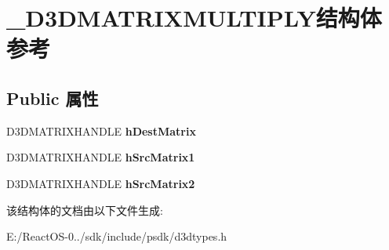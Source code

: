 \hypertarget{struct___d3_d_m_a_t_r_i_x_m_u_l_t_i_p_l_y}{}\section{\+\_\+\+D3\+D\+M\+A\+T\+R\+I\+X\+M\+U\+L\+T\+I\+P\+L\+Y结构体 参考}
\label{struct___d3_d_m_a_t_r_i_x_m_u_l_t_i_p_l_y}
\subsection*{Public 属性}
\begin{DoxyCompactItemize}
\item 
\mbox{\label{struct___d3_d_m_a_t_r_i_x_m_u_l_t_i_p_l_y_a82daf4eafea39a93fe3fef1de85a45c9}} 
D3\+D\+M\+A\+T\+R\+I\+X\+H\+A\+N\+D\+LE {\bfseries h\+Dest\+Matrix}
\item 
\mbox{\label{struct___d3_d_m_a_t_r_i_x_m_u_l_t_i_p_l_y_a9a647104dcb52a39288009c4c8f5952c}} 
D3\+D\+M\+A\+T\+R\+I\+X\+H\+A\+N\+D\+LE {\bfseries h\+Src\+Matrix1}
\item 
\mbox{\label{struct___d3_d_m_a_t_r_i_x_m_u_l_t_i_p_l_y_ab2954c9e8037cf865cf4ffbe660c27f3}} 
D3\+D\+M\+A\+T\+R\+I\+X\+H\+A\+N\+D\+LE {\bfseries h\+Src\+Matrix2}
\end{DoxyCompactItemize}


该结构体的文档由以下文件生成\+:\begin{DoxyCompactItemize}
\item 
E\+:/\+React\+O\+S-\/0../sdk/include/psdk/d3dtypes.\+h\end{DoxyCompactItemize}
